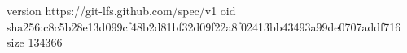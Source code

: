 version https://git-lfs.github.com/spec/v1
oid sha256:c8c5b28e13d099cf48b2d81bf32d09f22a8f02413bb43493a99de0707addf716
size 134366
